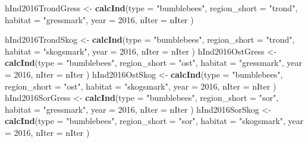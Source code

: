 \documentclass[]{article}
\newenvironment{Shaded}{\begin{snugshade}}{\end{snugshade}}
\newcommand{\KeywordTok}[1]{\textcolor[rgb]{0.13,0.29,0.53}{\textbf{#1}}}
\newcommand{\DataTypeTok}[1]{\textcolor[rgb]{0.13,0.29,0.53}{#1}}
\newcommand{\DecValTok}[1]{\textcolor[rgb]{0.00,0.00,0.81}{#1}}
\newcommand{\StringTok}[1]{\textcolor[rgb]{0.31,0.60,0.02}{#1}}
\newcommand{\NormalTok}[1]{#1}
\begin{document}
\begin{Shaded}
\begin{Highlighting}[]
\NormalTok{hInd2016TrondGress <-}\StringTok{ }\KeywordTok{calcInd}\NormalTok{(}\DataTypeTok{type =} \StringTok{"bumblebees"}\NormalTok{,}
                              \DataTypeTok{region_short =} \StringTok{"trond"}\NormalTok{,}
                              \DataTypeTok{habitat =} \StringTok{"gressmark"}\NormalTok{,}
                              \DataTypeTok{year =} \DecValTok{2016}\NormalTok{,}
                              \DataTypeTok{nIter =}\NormalTok{ nIter}
\NormalTok{                              )}
       
\NormalTok{hInd2016TrondSkog <-}\StringTok{ }\KeywordTok{calcInd}\NormalTok{(}\DataTypeTok{type =} \StringTok{"bumblebees"}\NormalTok{,}
                              \DataTypeTok{region_short =} \StringTok{"trond"}\NormalTok{,}
                              \DataTypeTok{habitat =} \StringTok{"skogsmark"}\NormalTok{,}
                              \DataTypeTok{year =} \DecValTok{2016}\NormalTok{,}
                              \DataTypeTok{nIter =}\NormalTok{ nIter}
\NormalTok{                              )}
\NormalTok{hInd2016OstGress <-}\StringTok{ }\KeywordTok{calcInd}\NormalTok{(}\DataTypeTok{type =} \StringTok{"bumblebees"}\NormalTok{,}
                              \DataTypeTok{region_short =} \StringTok{"ost"}\NormalTok{,}
                              \DataTypeTok{habitat =} \StringTok{"gressmark"}\NormalTok{,}
                              \DataTypeTok{year =} \DecValTok{2016}\NormalTok{,}
                              \DataTypeTok{nIter =}\NormalTok{ nIter}
\NormalTok{                              )}
\NormalTok{hInd2016OstSkog <-}\StringTok{ }\KeywordTok{calcInd}\NormalTok{(}\DataTypeTok{type =} \StringTok{"bumblebees"}\NormalTok{,}
                              \DataTypeTok{region_short =} \StringTok{"ost"}\NormalTok{,}
                              \DataTypeTok{habitat =} \StringTok{"skogsmark"}\NormalTok{,}
                              \DataTypeTok{year =} \DecValTok{2016}\NormalTok{,}
                              \DataTypeTok{nIter =}\NormalTok{ nIter}
\NormalTok{                              )}
\NormalTok{hInd2016SorGress <-}\StringTok{ }\KeywordTok{calcInd}\NormalTok{(}\DataTypeTok{type =} \StringTok{"bumblebees"}\NormalTok{,}
                              \DataTypeTok{region_short =} \StringTok{"sor"}\NormalTok{,}
                              \DataTypeTok{habitat =} \StringTok{"gressmark"}\NormalTok{,}
                              \DataTypeTok{year =} \DecValTok{2016}\NormalTok{,}
                              \DataTypeTok{nIter =}\NormalTok{ nIter}
\NormalTok{                              )}
\NormalTok{hInd2016SorSkog <-}\StringTok{ }\KeywordTok{calcInd}\NormalTok{(}\DataTypeTok{type =} \StringTok{"bumblebees"}\NormalTok{,}
                              \DataTypeTok{region_short =} \StringTok{"sor"}\NormalTok{,}
                              \DataTypeTok{habitat =} \StringTok{"skogsmark"}\NormalTok{,}
                              \DataTypeTok{year =} \DecValTok{2016}\NormalTok{,}
                              \DataTypeTok{nIter =}\NormalTok{ nIter}
\NormalTok{                              )}


\end{Highlighting}
\end{Shaded}
\end{document}
